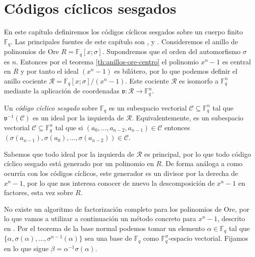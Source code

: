 \chapter{Códigos cíclicos sesgados}

En este capítulo definiremos los códigos cíclicos sesgados sobre un cuerpo finito \(\mathbb F_q\).
Las principales fuentes de este capítulo son \parencite{gomez-torrecillas_new_2016}, \parencite{gomez-torrecillas_petersongorensteinzierler_2018} y \parencite{shi_codes_2017}.
Consideremos el anillo de polinomios de Ore \(R = \mathbb F_q[x; \sigma]\).
Supondremos que el orden del automorfismo \(\sigma\) es \(n\).
Entonces por el teorema \ref{th:anillos-ore-centro} el polinomio \(x^n - 1\) es central en \(R\) y por tanto el ideal \((x^n - 1)\) es bilátero, por lo que podemos definir el anillo cociente \(\mathcal R = \mathbb F_q[x; \sigma]/(x^n - 1)\).
Este cociente \(\mathcal R\) es isomorfo a \(\mathbb F_q^n\) mediante la aplicación de coordenadas \(\mathfrak v : \mathcal R \to \mathbb F_q^n\).

\begin{definition}
  Un \emph{código cíclico sesgado} sobre \(\mathbb F_q\) es un subespacio vectorial \(\mathcal C \subseteq \mathbb F_q^n\) tal que \(\mathfrak v^{-1}(\mathcal C)\) es un ideal por la izquierda de \(\mathcal R\).
  Equivalentemente, es un subespacio vectorial \(\mathcal C \subseteq \mathbb F_q^n\) tal que si \((a_0, \dots, a_{n-2}, a_{n-1}) \in \mathcal C\) entonces \((\sigma(a_{n-1}), \sigma(a_0), \dots, \sigma(a_{n-2})) \in \mathcal C\).
\end{definition}


Sabemos que todo ideal por la izquierda de \(\mathcal R\) es principal, por lo que todo código cíclico sesgado está generado por un polinomio en \(R\).
De forma análoga a como ocurría con los códigos cíclicos, este generador es un divisor por la derecha de \(x^n - 1\), por lo que nos interesa conocer de nuevo la descomposición de \(x^n - 1\) en factores, esta vez sobre \(R\).

No existe un algoritmo de factorización completo para los polinomios de Ore, por lo que vamos a utilizar a continuación un método concreto para \(x^n - 1\), descrito en \parencite{gomez-torrecillas_new_2016}.
Por el teorema de la base normal podemos tomar un elemento \(\alpha \in \mathbb F_q\) tal que \(\{\alpha, \sigma(\alpha), \dots, \sigma^{n-1}(\alpha)\}\) sea una base de  \(\mathbb F_q\) como \(\mathbb F_q^{\sigma}\)-espacio vectorial.
Fijamos en lo que sigue \(\beta = \alpha^{-1}\sigma(\alpha)\).

